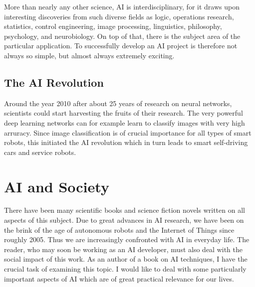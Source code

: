 \documentclass[10pt]{book}
\begin{document}
More than nearly any other science, AI is interdisciplinary, for it draws upon interesting discoveries from such diverse fields as logic, operations research, statistics, control engineering, image processing, linguistics, philosophy, psychology, and neurobiology. On top of that, there is the subject area of the particular application. To successfully develop an AI project is therefore not always so simple, but almost always extremely exciting.

\subsection{The AI Revolution}
Around the year 2010 after about 25 years of research on neural networks, scientists could start harvesting the fruits of their research. The very powerful deep learning networks can for example learn to classify images with very high arruracy. Since image classification is of crucial importance for all types of smart robots, this initiated the AI revolution which in turn leads to smart self-driving cars and service robots.

\section{AI and Society}
There have been many scientific books and science fiction novels written on all aspects of this subject. Due to great advances in AI research, we have been on the brink of the age of autonomous robots and the Internet of Things since roughly 2005. Thus we are increasingly confronted with AI in everyday life. The reader, who may soon be working as an AI developer, must also deal with the social impact of this work. As an author of a book on AI techniques, I have the crucial task of examining this topic. I would like to deal with some particularly important aspects of AI which are of great practical relevance for our lives.
\end{document}
